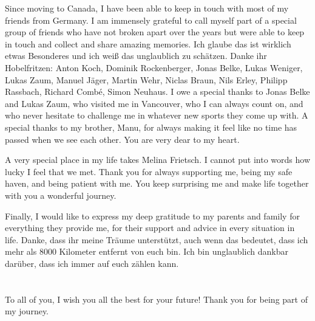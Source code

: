 Since moving to Canada, I have been able to keep in touch with most of my friends from Germany. 
I am immensely grateful to call myself part of a special group of friends who have not broken apart over the years but were able to keep in touch and collect and share amazing memories.
Ich glaube das ist wirklich etwas Besonderes und ich weiß das unglaublich zu schätzen. Danke ihr Hobelfritzen: 
Anton Koch, Dominik Rockenberger, Jonas Belke, Lukas Weniger, Lukas Zaum, Manuel Jäger, Martin Wehr, Niclas Braun, Nils Erley, Philipp Rassbach, Richard Combé, Simon Neuhaus.
I owe a special thanks to Jonas Belke and Lukas Zaum, who visited me in Vancouver, who I can always count on, and who never hesitate to challenge me in whatever new sports they come up with. 
A special thanks to my brother, Manu, for always making it feel like no time has passed when we see each other. You are very dear to my heart. 

A very special place in my life takes Melina Frietsch. 
I cannot put into words how lucky I feel that we met.
Thank you for always supporting me, being my safe haven, and being patient with me. 
You keep surprising me and make life together with you a wonderful journey.

Finally, I would like to express my deep gratitude to my parents and family for everything they provide me, for their support and advice in every situation in life. 
Danke, dass ihr meine Träume unterstützt, auch wenn das bedeutet, dass ich mehr als 8000 Kilometer entfernt von euch bin. 
Ich bin unglaublich dankbar darüber, dass ich immer auf euch zählen kann. 

\paragraph{}\mbox{}\\
To all of you, I wish you all the best for your future!
Thank you for being part of my journey. 